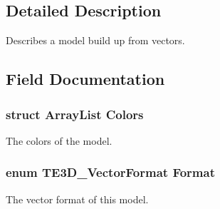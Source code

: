 \subsection{Detailed Description}
Describes a model build up from vectors. 

\subsection{Field Documentation}
\hypertarget{struct_t_e3_d___model4f_a25b98f42596bd573b7f64107a6c575f6}{
\subsubsection[{Colors}]{\setlength{\rightskip}{0pt plus 5cm}struct {\bf Array\-List} Colors}}\label{struct_t_e3_d___model4f_a25b98f42596bd573b7f64107a6c575f6}


The colors of the model. 

\hypertarget{struct_t_e3_d___model4f_adf87402a13af165fe3e16c98458b4d2c}{
\subsubsection[{Format}]{\setlength{\rightskip}{0pt plus 5cm}enum {\bf T\-E3\-D\-\_\-\-Vector\-Format} Format}}\label{struct_t_e3_d___model4f_adf87402a13af165fe3e16c98458b4d2c}


The vector format of this model. 

